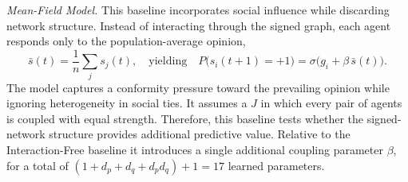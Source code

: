 \textit{Mean-Field Model.} This baseline incorporates social influence while discarding network
structure. Instead of interacting through the signed graph, each agent responds only to the
population-average opinion,
\vspace{-4pt}
\[
\bar{s}(t)=\frac{1}{n}\sum_j s_j(t),
\quad \text{yielding} \quad
P\big(s_i(t{+}1)=+1\big)
=
\sigma\!\big(g_i+\beta\,\bar{s}(t)\big).
\]
The model captures a conformity pressure toward the prevailing opinion while ignoring
heterogeneity in social ties. It assumes a $J$ in which every pair of agents is coupled with equal strength. Therefore, this baseline tests whether the signed-network structure provides additional predictive value. Relative
to the Interaction-Free baseline it introduces a single additional coupling parameter $\beta$, for a total of $(1+d_p+d_q+d_p d_q)+1 = 17$ learned parameters.
